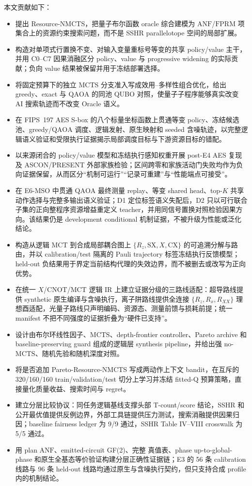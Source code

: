 \documentclass[UTF8,fontset=fandol,11pt]{ctexart}
\newcommand{\method}{Resource-NMCTS}
\newcommand{\anf}{\ensuremath{\mathrm{ANF}}}
\newcommand{\fprm}{\ensuremath{\mathrm{FPRM}}}
\newcommand{\mcts}{\ensuremath{\mathrm{MCTS}}}
\newcommand{\qaoa}{\ensuremath{\mathrm{QAOA}}}
\newcommand{\rz}{\ensuremath{R_z}}
\newcommand{\ttable}{真值表}
\begin{document}
本文贡献如下：
\begin{itemize}
  \item 提出 \method{}，把量子布尔函数 oracle 综合建模为 \anf{}/\fprm{} 项集合上的资源约束搜索问题，而不是 SSHR parallelotope 空间的局部扩展。
  \item 构造对单项式行置换不变、对输入变量重标号等变的共享 policy/value 主干，并用 C0--C7 因果消融区分 policy、value 与 progressive widening 的实际贡献；负向 value 结果被保留并用于冻结部署选择。
  \item 将固定预算下的独立 MCTS 分支准入写成效用--多样性组合优化，给出 greedy、exact 与 \qaoa{} 的同池 QUBO 对照，使量子子程序能够真实改变 AI 搜索轨迹而不改变 Oracle 语义。
  \item 在 FIPS~197 AES S-box 的八个标量坐标函数上贯通等变 policy、冻结候选池、greedy/\qaoa{} 调度、逻辑发射、原生映射和 seeded 含噪轨迹，以完整逻辑语义验证和受限执行证据揭示局部调度目标与下游资源目标的错配。
  \item 以来源闭合的 policy/value 模型和冻结执行感知权重开展 post-E4 AES 复现及 ASCON/PRESENT 外部家族检验；区间跨零和家族活动门失败均作为负向证据保留，从而区分“机制可运行”“记录可重建”与“性能端点可接受”。
  \item 在 E6-MSO 中贯通 \qaoa{} 最终测量 replay、等变 shared head、top-$K$ 共享动作选择与完整多输出语义验证；D1 定位标签语义失配后，D2 只以可行联合子集的正向整程序资源增益重定义 teacher，并用同信号置换对照检验因果方向。该结果仍是 development conditional 机制证据，不被升级为性能或泛化结论。
  \item 构造从逻辑 MCT 到合成局部耦合图上 $\{\rz,\mathrm{SX},X,\mathrm{CX}\}$ 的可追溯分解与路由，并以 calibration/test 隔离的 Pauli trajectory 标签冻结执行反馈模型；held-out 负结果用于界定当前结构代理的失效边界，而不被删去或改写为正向优势。
  \item 在统一 $X$/CNOT/MCT 逻辑 IR 上建立证据分级的三路线适配：超导路线提供 synthetic 原生编译与含噪执行，离子阱路线提供全连接 $\{R_z,R_x,R_{XX}\}$ 理想酉适配，光量子路线只声明编码、资源态、测量前馈与损耗前提；统一 manifest 不把不同强度的证据折叠为“硬件已支持”。
  \item 设计由布尔环线性因子、\mcts{}、depth-frontier controller、Pareto archive 和 baseline-preserving guard 组成的逻辑层 synthesis pipeline，并给出强 no-\mcts{}、随机先验和随机深度对照。
  \item 将是否追加 Pareto-\method{} 写成两动作上下文 bandit，在互斥的 320/160/160 train/validation/test 切分上学习并冻结 fitted-Q 预算策略，直接量化质量收益、搜索时间与 regret。
  \item 建立分层比较协议：同任务逻辑基线支撑头部 T-count/score 结论，SSHR 和公开最优值提供反例边界，外部工具链提供压力测试，搜索消融提供因果归因；baseline fairness ledger 为 9/9 通过，SSHR Table IV--VIII crosswalk 为 5/5 通过。
  \item 用 plan \anf{}、emitted-circuit GF(2)、完整 \ttable{}、phase up-to-global-phase 和原生全基态等价验证构建分层正确性证据链；E3 的 56 条 calibration 线路与 96 条 held-out 线路均通过原生与含噪执行契约，但只支持合成 profile 内的机制结论。
\end{itemize}
\end{document}
